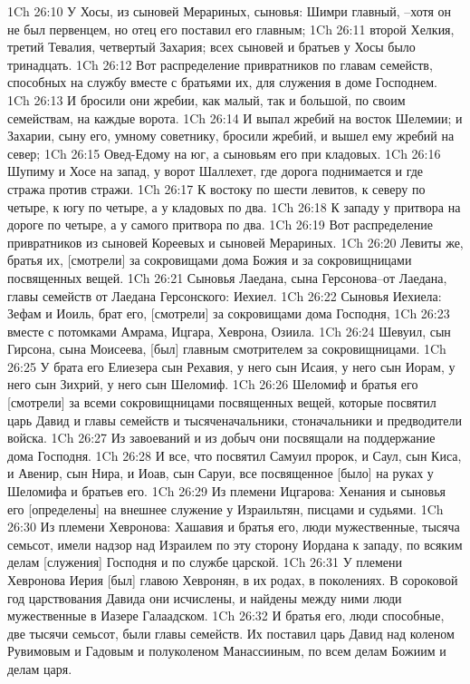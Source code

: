 1Ch 26:10  У Хосы, из сыновей Мерариных, сыновья: Шимри главный, --хотя он не был первенцем, но отец его поставил его главным;
1Ch 26:11  второй Хелкия, третий Тевалия, четвертый Захария; всех сыновей и братьев у Хосы было тринадцать.
1Ch 26:12  Вот распределение привратников по главам семейств, способных на службу вместе с братьями их, для служения в доме Господнем.
1Ch 26:13  И бросили они жребии, как малый, так и большой, по своим семействам, на каждые ворота.
1Ch 26:14  И выпал жребий на восток Шелемии; и Захарии, сыну его, умному советнику, бросили жребий, и вышел ему жребий на север;
1Ch 26:15  Овед-Едому на юг, а сыновьям его при кладовых.
1Ch 26:16  Шупиму и Хосе на запад, у ворот Шаллехет, где дорога поднимается и где стража против стражи.
1Ch 26:17  К востоку по шести левитов, к северу по четыре, к югу по четыре, а у кладовых по два.
1Ch 26:18  К западу у притвора на дороге по четыре, а у самого притвора по два.
1Ch 26:19  Вот распределение привратников из сыновей Кореевых и сыновей Мерариных.
1Ch 26:20  Левиты же, братья их, [смотрели] за сокровищами дома Божия и за сокровищницами посвященных вещей.
1Ch 26:21  Сыновья Лаедана, сына Герсонова--от Лаедана, главы семейств от Лаедана Герсонского: Иехиел.
1Ch 26:22  Сыновья Иехиела: Зефам и Иоиль, брат его, [смотрели] за сокровищами дома Господня,
1Ch 26:23  вместе с потомками Амрама, Ицгара, Хеврона, Озиила.
1Ch 26:24  Шевуил, сын Гирсона, сына Моисеева, [был] главным смотрителем за сокровищницами.
1Ch 26:25  У брата его Елиезера сын Рехавия, у него сын Исаия, у него сын Иорам, у него сын Зихрий, у него сын Шеломиф.
1Ch 26:26  Шеломиф и братья его [смотрели] за всеми сокровищницами посвященных вещей, которые посвятил царь Давид и главы семейств и тысяченачальники, стоначальники и предводители войска.
1Ch 26:27  Из завоеваний и из добыч они посвящали на поддержание дома Господня.
1Ch 26:28  И все, что посвятил Самуил пророк, и Саул, сын Киса, и Авенир, сын Нира, и Иоав, сын Саруи, все посвященное [было] на руках у Шеломифа и братьев его.
1Ch 26:29  Из племени Ицгарова: Хенания и сыновья его [определены] на внешнее служение у Израильтян, писцами и судьями.
1Ch 26:30  Из племени Хевронова: Хашавия и братья его, люди мужественные, тысяча семьсот, имели надзор над Израилем по эту сторону Иордана к западу, по всяким делам [служения] Господня и по службе царской.
1Ch 26:31  У племени Хевронова Иерия [был] главою Хевронян, в их родах, в поколениях. В сороковой год царствования Давида они исчислены, и найдены между ними люди мужественные в Иазере Галаадском.
1Ch 26:32  И братья его, люди способные, две тысячи семьсот, были главы семейств. Их поставил царь Давид над коленом Рувимовым и Гадовым и полуколеном Манассииным, по всем делам Божиим и делам царя.
